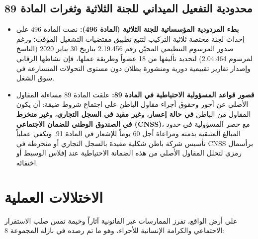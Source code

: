 \subsection{محدودية التفعيل الميداني للجنة الثلاثية وثغرات المادة 89}
\begin{itemize}[leftmargin=*, itemsep=6pt]
    \item \textbf{بطء المردودية المؤسساتية للجنة الثلاثية (المادة \textenglish{496}):} نصت المادة \textenglish{496} على إحداث لجنة مختصة ثلاثية التركيب لتتبع تطبيق مقتضيات التشغيل المؤقت؛ ورغم صدور المرسوم التنظيمي المحيّن رقم \textenglish{2.19.456} بتاريخ \textenglish{30} يناير \textenglish{2020} (الناسخ لمرسوم \textenglish{2.04.464}) لتحديد تأليفها من \textenglish{18} عضواً وطريقة عملها، فإن نشاطها الرقابي وإصدار تقارير تقييمية دورية ومنشورة يظلان دون مستوى التحولات المتسارعة في سوق الشغل.
    \item \textbf{قصور قواعد المسؤولية الاحتياطية في المادة \textenglish{89}:} علقت المادة \textenglish{89} مساءلة المقاول الأصلي عن أجور وحقوق أجراء مقاول الباطن على اجتماع شروط ضيقة: أن يكون المقاول من الباطن \textbf{في حالة إعسار}، و\textbf{غير مقيد في السجل التجاري}، و\textbf{غير منخرط في الصندوق الوطني للضمان الاجتماعي (\textenglish{CNSS})}، مع حصر المسؤولية في حدود المبالغ المتبقية بذمته ومراعاة أجل \textenglish{60} يوماً للإشعار في المادة \textenglish{91}. ويكفي عملياً تأسيس شركة باطن شكلية مقيدة بالسجل التجاري أو منخرطة في \textenglish{CNSS} برأسمال رمزي لتحلل المقاول الأصلي من هذه الضمانة الاحتياطية عند إفلاس الوسيط أو اختفائه.
\end{itemize}

\section{الاختلالات العملية}

على أرض الواقع، تفرز الممارسات غير القانونية آثاراً وخيمة تمس صلب الاستقرار الاجتماعي والكرامة الإنسانية للأجراء، وهو ما تم رصده في نازلة المجموعة \textenglish{8}:

